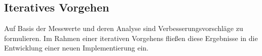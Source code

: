 \subsection{Iteratives Vorgehen}
Auf Basis der Messwerte und deren Analyse sind Verbesserungsvorschläge zu formulieren. Im Rahmen einer iterativen Vorgehens fließen diese Ergebnisse in die Entwicklung einer neuen Implementierung ein.
